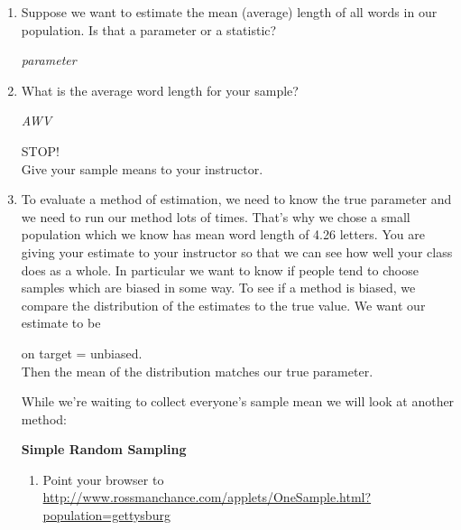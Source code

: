 \begin{enumerate}
\item Suppose we want to estimate the mean (average) length of all
  words in our population. Is that a parameter or a statistic?
\begin{students}
  \vspace{1cm}
\end{students}    
\begin{key}
   {\it parameter}
\end{key}
\item What is the average word length for your sample?
\begin{students}
  \vspace{1cm}
\end{students}    
\begin{key}
   {\it AWV}
\end{key}

  \begin{center}
    {\huge STOP!}\\
Give your sample means to your instructor.
  \end{center}

\item To evaluate a method of estimation, we need to know the true
  parameter and we need to run our method lots of times.  That's why we
  chose a small population which we know has mean word length of 4.26
  letters. You are giving your estimate to your instructor so that we
  can see how well your class does as a whole.  In particular we want
  to know if people tend to choose samples which are biased in some
  way. To see if a method is biased, we compare the distribution of
  the estimates to the true value.  We want our estimate to be
  \begin{center}
    {\large on target = unbiased.}\\
  Then the mean of the distribution matches our true parameter.
  \end{center}
  While we're waiting to collect everyone's sample mean we will look
  at another method:
  \begin{center}
    {\bf Simple Random Sampling}
  \end{center}
  \begin{enumerate}
    \item Point your browser to \\

\url{http://www.rossmanchance.com/applets/OneSample.html?population=gettysburg}
  
     


\end{enumerate}
\end{enumerate}
